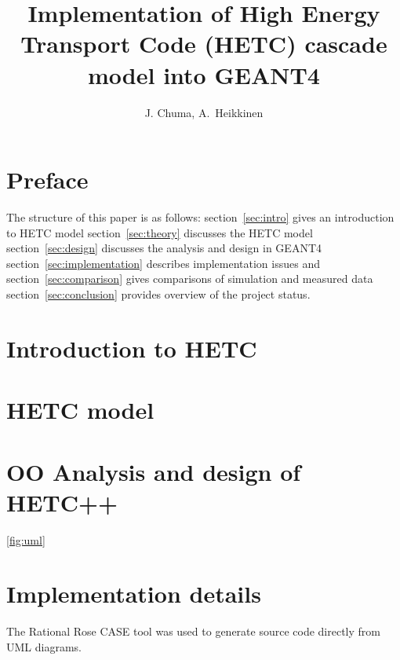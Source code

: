 \documentclass{hep99}
\begin{document}
\title{Implementation of High Energy Transport Code (HETC) cascade
model into GEANT4}
\author{J. Chuma, A.~Heikkinen}
\address{Helsinki Institute of Physics, University of Helsinki,
Finland\\[3pt]
E-mail: {\tt Aatos.Heikkinen@cern.ch}}

\maketitle
\section{Preface}
\cite{geant4}

The structure of this paper is as follows:
section~\ref{sec:intro} gives an introduction to HETC model
section~\ref{sec:theory} discusses the HETC model
section~\ref{sec:design} discusses the analysis and design in GEANT4
section~\ref{sec:implementation} describes implementation issues and
section~\ref{sec:comparison} gives comparisons of simulation and
measured data
section~\ref{sec:conclusion} provides  overview of the project status.

\section{Introduction to HETC\label{sec:intro}}
\section{HETC model\label{sec:theory}}
\section{OO Analysis and design of HETC++\label{sec:design}}

\ref{fig:uml} 

\section{Implementation details\label{sec:implementation}}
The Rational Rose CASE tool was used to generate source code directly
from UML diagrams. 
\end{document}
